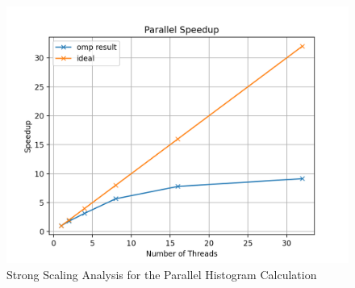 \documentclass[unicode,11pt,a4paper,oneside,numbers=endperiod,openany]{scrartcl}
\begin{document}
\begin{figure}[H]
  \centering
  \includegraphics[width=\textwidth]{Images_Output/hist_speedup.png}
  \caption{Strong Scaling Analysis for the Parallel Histogram Calculation}
  \label{fig:hist_speedup}
\end{figure}
\end{document}
